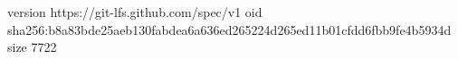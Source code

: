 version https://git-lfs.github.com/spec/v1
oid sha256:b8a83bde25aeb130fabdea6a636ed265224d265ed11b01cfdd6fbb9fe4b5934d
size 7722
